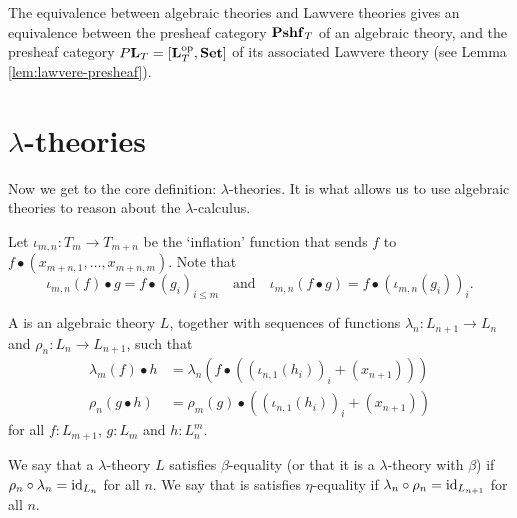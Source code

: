The equivalence between algebraic theories and Lawvere theories gives an equivalence between the presheaf category $ \mathbf{Pshf}_{T} $ of an algebraic theory, and the presheaf category $ P \mathbf{L}_T = [\mathbf{L}_T^{\text{op}}, \mathbf{Set}] $ of its associated Lawvere theory (see Lemma \ref{lem:lawvere-presheaf}).

\section{\texorpdfstring{$ \lambda $-}{lambda-}theories}\label{sec:lambda-theories}

Now we get to the core definition: $ \lambda $-theories. It is what allows us to use algebraic theories to reason about the $ \lambda $-calculus.

Let $ \iota_{m, n} : T_m \to T_{m + n} $ be the `inflation' function that sends $ f $ to $ f \bullet (x_{m + n, 1}, \dots, x_{m + n, m}) $. Note that
\[ \iota_{m, n}(f) \bullet g = f \bullet (g_i)_{i \leq m} \quad \text{and} \quad \iota_{m, n}(f \bullet g) = f \bullet (\iota_{m, n}(g_i))_i. \]

\begin{definition}
  A  is an algebraic theory $ L $, together with sequences of functions $ \lambda_n: L_{n + 1} \to L_n $ and $ \rho_n: L_n \to L_{n + 1} $, such that
  \begin{align*}
    \lambda_m(f) \bullet h &= \lambda_n(f \bullet ((\iota_{n, 1}(h_i))_i + (x_{n + 1})))\\
    \rho_n(g \bullet h) &= \rho_m(g) \bullet ((\iota_{n, 1}(h_i))_i + (x_{n + 1}))
  \end{align*}
  for all $ f: L_{m + 1} $, $ g: L_m $ and $ h: L_n^m $.
\end{definition}

\begin{definition}\label{def:beta-equality}
  We say that a $ \lambda $-theory $ L $ satisfies $ \beta $-equality (or that it is a $ \lambda $-theory with $ \beta $) if $ \rho_n \circ \lambda_n = \text{id}_{L_n} $ for all $ n $. We say that is satisfies $ \eta $-equality if $ \lambda_n \circ \rho_n = \text{id}_{L_{n + 1}} $ for all $ n $.
\end{definition}

